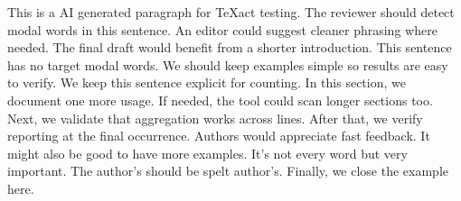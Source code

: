 \documentclass{article}
\begin{document}
This is a AI generated paragraph for TeXact testing.
The reviewer should detect modal words in this sentence.
An editor could suggest cleaner phrasing where needed.
The final draft would benefit from a shorter introduction.
This sentence has no target modal words.
We should keep examples simple so results are easy to verify.
We keep this sentence explicit for counting.
In this section, we document one more usage.
If needed, the tool could scan longer sections too.
Next, we validate that aggregation works across lines.
After that, we verify reporting at the final occurrence.
Authors would appreciate fast feedback.
It might also be good to have more examples.
It's not every word but very important.
The author's should be spelt author's.
Finally, we close the example here.
\end{document}
